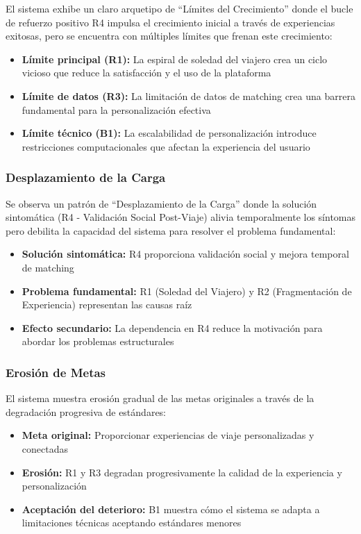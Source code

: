 \documentclass[12pt, letterpaper]{article}
\begin{document}
El sistema exhibe un claro arquetipo de ``Límites del Crecimiento'' donde el bucle de refuerzo positivo R4 impulsa el crecimiento inicial a través de experiencias exitosas, pero se encuentra con múltiples límites que frenan este crecimiento:

\begin{itemize}
\item \textbf{Límite principal (R1):} La espiral de soledad del viajero crea un ciclo vicioso que reduce la satisfacción y el uso de la plataforma
\item \textbf{Límite de datos (R3):} La limitación de datos de matching crea una barrera fundamental para la personalización efectiva
\item \textbf{Límite técnico (B1):} La escalabilidad de personalización introduce restricciones computacionales que afectan la experiencia del usuario
\end{itemize}

\subsubsection{Desplazamiento de la Carga}

Se observa un patrón de ``Desplazamiento de la Carga'' donde la solución sintomática (R4 - Validación Social Post-Viaje) alivia temporalmente los síntomas pero debilita la capacidad del sistema para resolver el problema fundamental:

\begin{itemize}
\item \textbf{Solución sintomática:} R4 proporciona validación social y mejora temporal de matching
\item \textbf{Problema fundamental:} R1 (Soledad del Viajero) y R2 (Fragmentación de Experiencia) representan las causas raíz
\item \textbf{Efecto secundario:} La dependencia en R4 reduce la motivación para abordar los problemas estructurales
\end{itemize}

\subsubsection{Erosión de Metas}

El sistema muestra erosión gradual de las metas originales a través de la degradación progresiva de estándares:

\begin{itemize}
\item \textbf{Meta original:} Proporcionar experiencias de viaje personalizadas y conectadas
\item \textbf{Erosión:} R1 y R3 degradan progresivamente la calidad de la experiencia y personalización
\item \textbf{Aceptación del deterioro:} B1 muestra cómo el sistema se adapta a limitaciones técnicas aceptando estándares menores
\end{itemize}
\end{document}
